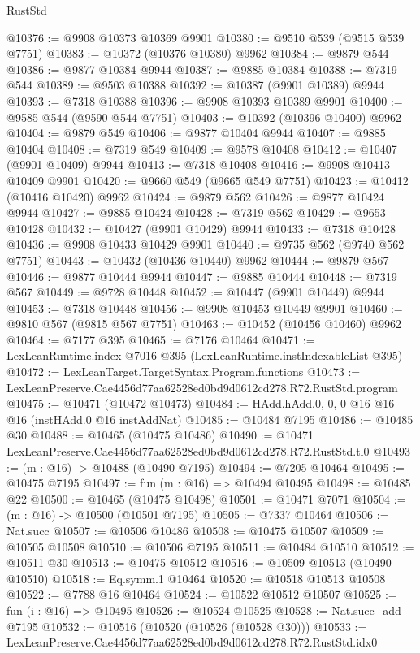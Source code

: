 \begin{lexlean}{RustStd}
\begin{coremodule}
@10376 := @9908 @10373 @10369 @9901
@10380 := @9510 @539 (@9515 @539 @7751)
@10383 := @10372 (@10376 @10380) @9962
@10384 := @9879 @544
@10386 := @9877 @10384 @9944
@10387 := @9885 @10384
@10388 := @7319 @544
@10389 := @9503 @10388
@10392 := @10387 (@9901 @10389) @9944
@10393 := @7318 @10388
@10396 := @9908 @10393 @10389 @9901
@10400 := @9585 @544 (@9590 @544 @7751)
@10403 := @10392 (@10396 @10400) @9962
@10404 := @9879 @549
@10406 := @9877 @10404 @9944
@10407 := @9885 @10404
@10408 := @7319 @549
@10409 := @9578 @10408
@10412 := @10407 (@9901 @10409) @9944
@10413 := @7318 @10408
@10416 := @9908 @10413 @10409 @9901
@10420 := @9660 @549 (@9665 @549 @7751)
@10423 := @10412 (@10416 @10420) @9962
@10424 := @9879 @562
@10426 := @9877 @10424 @9944
@10427 := @9885 @10424
@10428 := @7319 @562
@10429 := @9653 @10428
@10432 := @10427 (@9901 @10429) @9944
@10433 := @7318 @10428
@10436 := @9908 @10433 @10429 @9901
@10440 := @9735 @562 (@9740 @562 @7751)
@10443 := @10432 (@10436 @10440) @9962
@10444 := @9879 @567
@10446 := @9877 @10444 @9944
@10447 := @9885 @10444
@10448 := @7319 @567
@10449 := @9728 @10448
@10452 := @10447 (@9901 @10449) @9944
@10453 := @7318 @10448
@10456 := @9908 @10453 @10449 @9901
@10460 := @9810 @567 (@9815 @567 @7751)
@10463 := @10452 (@10456 @10460) @9962
@10464 := @7177 @395
@10465 := @7176 @10464
@10471 := LexLeanRuntime.index @7016 @395 (LexLeanRuntime.instIndexableList @395)
@10472 := LexLeanTarget.TargetSyntax.Program.functions
@10473 := LexLeanPreserve.Cae4456d77aa62528ed0bd9d0612cd278.R72.RustStd.program
@10475 := @10471 (@10472 @10473)
@10484 := HAdd.hAdd.{0, 0, 0} @16 @16 @16 (instHAdd.{0} @16 instAddNat)
@10485 := @10484 @7195
@10486 := @10485 @30
@10488 := @10465 (@10475 @10486)
@10490 := @10471 LexLeanPreserve.Cae4456d77aa62528ed0bd9d0612cd278.R72.RustStd.tl0
@10493 := (m : @16) -> @10488 (@10490 @7195)
@10494 := @7205 @10464
@10495 := @10475 @7195
@10497 := fun (m : @16) => @10494 @10495
@10498 := @10485 @22
@10500 := @10465 (@10475 @10498)
@10501 := @10471 @7071
@10504 := (m : @16) -> @10500 (@10501 @7195)
@10505 := @7337 @10464
@10506 := Nat.succ
@10507 := @10506 @10486
@10508 := @10475 @10507
@10509 := @10505 @10508
@10510 := @10506 @7195
@10511 := @10484 @10510
@10512 := @10511 @30
@10513 := @10475 @10512
@10516 := @10509 @10513 (@10490 @10510)
@10518 := Eq.symm.{1} @10464
@10520 := @10518 @10513 @10508
@10522 := @7788 @16 @10464
@10524 := @10522 @10512 @10507
@10525 := fun (i : @16) => @10495
@10526 := @10524 @10525
@10528 := Nat.succ_add @7195
@10532 := @10516 (@10520 (@10526 (@10528 @30)))
@10533 := LexLeanPreserve.Cae4456d77aa62528ed0bd9d0612cd278.R72.RustStd.idx0

\end{coremodule}
\end{lexlean}
